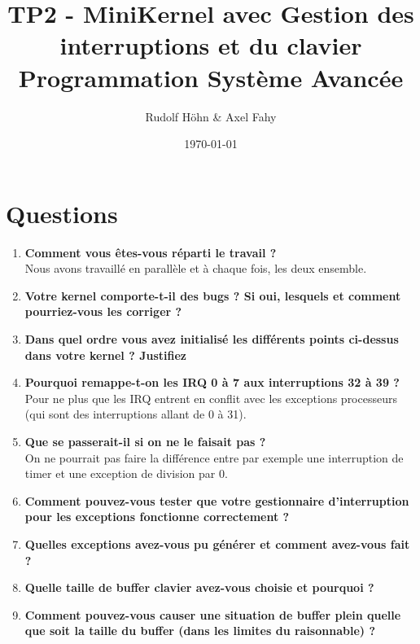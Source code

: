 \documentclass[a4paper]{article}
\title{TP2 - MiniKernel avec Gestion des interruptions et du clavier\\Programmation Système Avancée}
\author{Rudolf Höhn \& Axel Fahy}
\date{\today}
\begin{document}
\maketitle

\section{Questions}
\begin{enumerate}
\item \textbf{Comment vous êtes-vous réparti le travail ?}\\
Nous avons travaillé en parallèle et à chaque fois, les deux ensemble. 
\item \textbf{Votre kernel comporte-t-il des bugs ? Si oui, lesquels et comment pourriez-vous les corriger ?}\\
\item \textbf{Dans quel ordre vous avez initialisé les différents points ci-dessus dans votre kernel ? Justifiez}\\

\item \textbf{Pourquoi remappe-t-on les IRQ 0 à 7 aux interruptions 32 à 39 ?}\\
Pour ne plus que les IRQ entrent en conflit avec les exceptions processeurs (qui sont des interruptions allant de 0 à 31).
\item \textbf{Que se passerait-il si on ne le faisait pas ?}\\
On ne pourrait pas faire la différence entre par exemple une interruption de timer et une exception de division par 0.
\item \textbf{Comment pouvez-vous tester que votre gestionnaire d'interruption pour les exceptions fonctionne correctement ?}
\item \textbf{Quelles exceptions avez-vous pu générer et comment avez-vous fait ?}
\item \textbf{Quelle taille de buffer clavier avez-vous choisie et pourquoi ?}
\item \textbf{Comment pouvez-vous causer une situation de buffer plein quelle que soit la taille du buffer (dans les limites du raisonnable) ?}
\end{enumerate}
\end{document}
